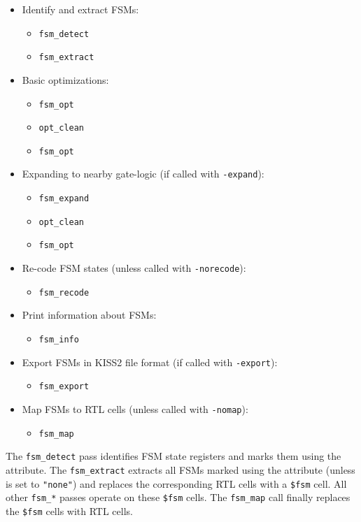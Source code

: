 \begin{itemize}
\item Identify and extract FSMs:
\begin{itemize}
\item {\tt fsm\_detect}
\item {\tt fsm\_extract}
\end{itemize}

\item Basic optimizations:
\begin{itemize}
\item {\tt fsm\_opt}
\item {\tt opt\_clean}
\item {\tt fsm\_opt}
\end{itemize}

\item Expanding to nearby gate-logic (if called with {\tt -expand}):
\begin{itemize}
\item {\tt fsm\_expand}
\item {\tt opt\_clean}
\item {\tt fsm\_opt}
\end{itemize}

\item Re-code FSM states (unless called with {\tt -norecode}):
\begin{itemize}
\item {\tt fsm\_recode}
\end{itemize}

\item Print information about FSMs:
\begin{itemize}
\item {\tt fsm\_info}
\end{itemize}

\item Export FSMs in KISS2 file format (if called with {\tt -export}):
\begin{itemize}
\item {\tt fsm\_export}
\end{itemize}

\item Map FSMs to RTL cells (unless called with {\tt -nomap}):
\begin{itemize}
\item {\tt fsm\_map}
\end{itemize}
\end{itemize}

The {\tt fsm\_detect} pass identifies FSM state registers and marks them using the
 attribute. The {\tt fsm\_extract} extracts all
FSMs marked using the  attribute (unless  is
set to {\tt "none"}) and replaces the corresponding RTL cells with a {\tt \$fsm}
cell. All other {\tt fsm\_*} passes operate on these {\tt \$fsm} cells. The
{\tt fsm\_map} call finally replaces the {\tt \$fsm} cells with RTL cells.

